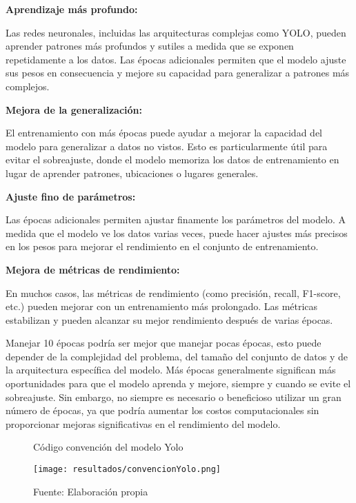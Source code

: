 \textbf{Aprendizaje más profundo:}

Las redes neuronales, incluidas las arquitecturas complejas como YOLO, pueden aprender patrones más profundos y sutiles a medida que se exponen repetidamente a los datos. Las épocas adicionales permiten que el modelo ajuste sus pesos en consecuencia y mejore su capacidad para generalizar a patrones más complejos. \newline

\textbf{Mejora de la generalización:}

El entrenamiento con más épocas puede ayudar a mejorar la capacidad del modelo para generalizar a datos no vistos. Esto es particularmente útil para evitar el sobreajuste, donde el modelo memoriza los datos de entrenamiento en lugar de aprender patrones, ubicaciones o lugares generales. \newline

\textbf{Ajuste fino de parámetros:}

Las épocas adicionales permiten ajustar finamente los parámetros del modelo. A medida que el modelo ve los datos varias veces, puede hacer ajustes más precisos en los pesos para mejorar el rendimiento en el conjunto de entrenamiento. \newline

\textbf{Mejora de métricas de rendimiento:}

En muchos casos, las métricas de rendimiento (como precisión, recall, F1-score, etc.) pueden mejorar con un entrenamiento más prolongado. Las métricas estabilizan y pueden alcanzar su mejor rendimiento después de varias épocas.

\newpage

Manejar 10 épocas podría ser mejor que manejar pocas épocas, esto puede depender de la complejidad del problema, del tamaño del conjunto de datos y de la arquitectura específica del modelo. Más épocas generalmente significan más oportunidades para que el modelo aprenda y mejore, siempre y cuando se evite el sobreajuste. Sin embargo, no siempre es necesario o beneficioso utilizar un gran número de épocas, ya que podría aumentar los costos computacionales sin proporcionar mejoras significativas en el rendimiento del modelo.

\begin{figure}[h]
\centering
\caption{Código convención del modelo Yolo}
\texttt{[image: resultados/convencionYolo.png]}
\caption*{\footnotesize Fuente: Elaboración propia}
\label{fig:figuraConvencionYolo}
\end{figure}

